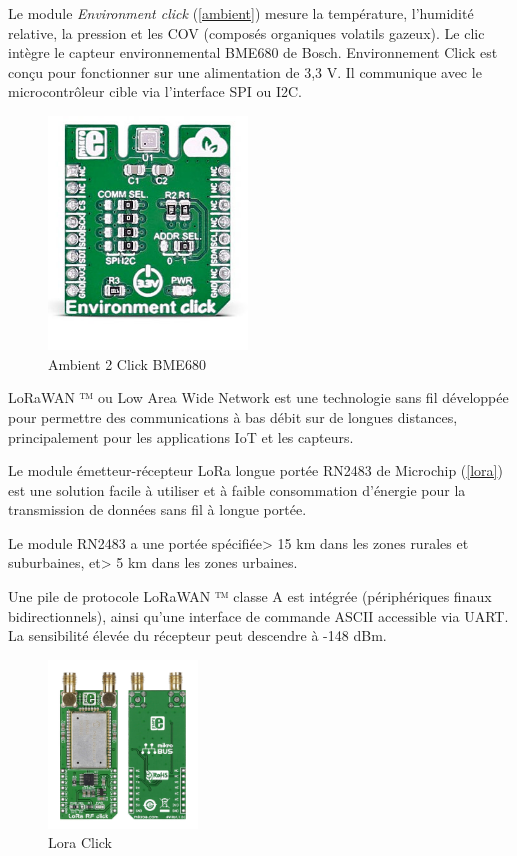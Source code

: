 \documentclass[12pt]{article}
\begin{document}
Le module \textit{Environment click} (\autoref{ambient}) mesure la température, l'humidité relative, la pression et les COV (composés organiques volatils gazeux). Le clic intègre le capteur environnemental BME680 de Bosch. Environnement Click est conçu pour fonctionner sur une alimentation de 3,3 V. Il communique avec le microcontrôleur cible via l'interface SPI ou I2C.

\begin{figure}[!h]
	\centering
	\includegraphics[width=200px]{ambient}
	\caption{Ambient 2 Click BME680}
	\label{ambient}
\end{figure}

\newpage
LoRaWAN ™ ou Low Area Wide Network est une technologie sans fil développée pour permettre des communications à bas débit sur de longues distances, principalement pour les applications IoT et les capteurs.

Le module émetteur-récepteur LoRa longue portée RN2483 de Microchip (\autoref{lora}) est une solution facile à utiliser et à faible consommation d'énergie pour la transmission de données sans fil à longue portée.

Le module RN2483 a une portée spécifiée> 15 km dans les zones rurales et suburbaines, et> 5 km dans les zones urbaines.

Une pile de protocole LoRaWAN ™ classe A est intégrée (périphériques finaux bidirectionnels), ainsi qu'une interface de commande ASCII accessible via UART. La sensibilité élevée du récepteur peut descendre à -148 dBm.
\begin{figure}[!h]
	\centering
	\includegraphics[width=150px]{lora}
	\caption{Lora Click}
	\label{lora}
\end{figure}
\end{document}
